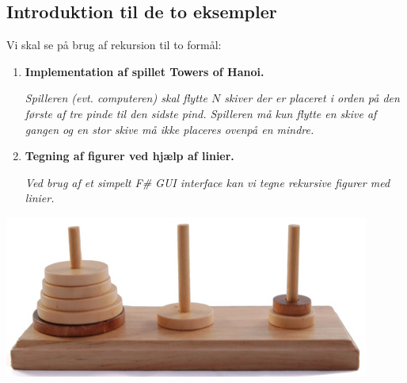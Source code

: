 \documentclass[rgb]{beamer}
\begin{document}
\subsection*{Introduktion til de to eksempler}

\begin{frame}[fragile]
\begin{footnotesize}


  Vi skal se på brug af rekursion til to formål:

  \vspace{1ex}

  \begin{minipage}{0.5\textwidth}
  \begin{enumerate}
  \item \textbf{Implementation af spillet Towers of Hanoi.}

    \emph{Spilleren (evt. computeren) skal flytte $N$ skiver der er
      placeret i orden på den første af tre pinde til den sidste
      pind. Spilleren må kun flytte en skive af gangen og en stor
      skive må ikke placeres ovenpå en mindre.}

    \vspace{2ex}

  \item \textbf{Tegning af figurer ved hjælp af linier.}

    \emph{Ved brug af et simpelt F\# GUI interface kan vi tegne
      rekursive figurer med linier.}
  \end{enumerate}
\end{minipage}\hspace{8mm}\begin{minipage}[c]{0.4\textwidth}

\hfill\includegraphics[width=0.9\textwidth]{../images/towersofhanoi.png}


\end{minipage}
\end{footnotesize}
\end{frame}
\end{document}
